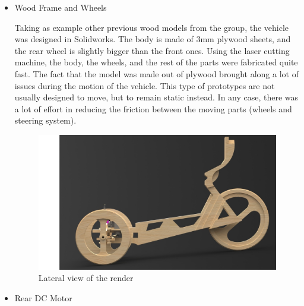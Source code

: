 \begin{itemize}
\begin{itemize}
	\item Wood Frame and Wheels
	
	Taking as example other previous wood models from the group, the vehicle was designed in Solidworks. The body is made of 3mm plywood sheets, and the rear wheel is slightly bigger than the front ones. Using the laser cutting machine, the body, the wheels, and the rest of the parts were fabricated quite fast. The fact that the model was made out of plywood brought along a lot of issues during the motion of the vehicle. This type of prototypes are not usually designed to move, but to remain static instead. In any case, there was a lot of effort in reducing the friction between the moving parts (wheels and steering system).
	
	\begin{figure}[h!]
		\includegraphics[width=1.0\linewidth]{figs/04/11}
		\caption{Lateral view of the render}
	\end{figure}
	
	\newpage
	\item Rear DC Motor
	

\end{itemize}
\end{itemize}
